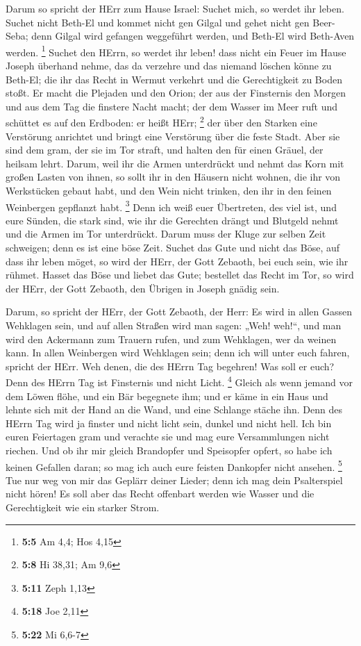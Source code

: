  Darum so spricht der HErr zum Hause Israel: Suchet mich, so
werdet ihr leben.  Suchet nicht Beth-El und kommet nicht gen
Gilgal und gehet nicht gen Beer-Seba; denn Gilgal wird gefangen
weggeführt werden, und Beth-El wird Beth-Aven werden. \footnote{\textbf{5:5}
  Am 4,4; Hos 4,15}  Suchet den HErrn, so werdet ihr leben!
dass nicht ein Feuer im Hause Joseph überhand nehme, das da verzehre und
das niemand löschen könne zu Beth-El;  die ihr das Recht in
Wermut verkehrt und die Gerechtigkeit zu Boden stoßt.  Er
macht die Plejaden und den Orion; der aus der Finsternis den Morgen und
aus dem Tag die finstere Nacht macht; der dem Wasser im Meer ruft und
schüttet es auf den Erdboden: er heißt HErr; \footnote{\textbf{5:8} Hi
  38,31; Am 9,6}  der über den Starken eine Verstörung
anrichtet und bringt eine Verstörung über die feste Stadt. 
Aber sie sind dem gram, der sie im Tor straft, und halten den für einen
Gräuel, der heilsam lehrt.  Darum, weil ihr die Armen
unterdrückt und nehmt das Korn mit großen Lasten von ihnen, so sollt ihr
in den Häusern nicht wohnen, die ihr von Werkstücken gebaut habt, und
den Wein nicht trinken, den ihr in den feinen Weinbergen gepflanzt habt.
\footnote{\textbf{5:11} Zeph 1,13}  Denn ich weiß euer
Übertreten, des viel ist, und eure Sünden, die stark sind, wie ihr die
Gerechten drängt und Blutgeld nehmt und die Armen im Tor unterdrückt.
 Darum muss der Kluge zur selben Zeit schweigen; denn es
ist eine böse Zeit.  Suchet das Gute und nicht das Böse,
auf dass ihr leben möget, so wird der HErr, der Gott Zebaoth, bei euch
sein, wie ihr rühmet.  Hasset das Böse und liebet das Gute;
bestellet das Recht im Tor, so wird der HErr, der Gott Zebaoth, den
Übrigen in Joseph gnädig sein.

 Darum, so spricht der HErr, der Gott Zebaoth, der Herr: Es
wird in allen Gassen Wehklagen sein, und auf allen Straßen wird man
sagen: „Weh! weh!{}``, und man wird den Ackermann zum Trauern rufen, und
zum Wehklagen, wer da weinen kann.  In allen Weinbergen
wird Wehklagen sein; denn ich will unter euch fahren, spricht der HErr.
 Weh denen, die des HErrn Tag begehren! Was soll er euch?
Denn des HErrn Tag ist Finsternis und nicht Licht. \footnote{\textbf{5:18}
  Joe 2,11}  Gleich als wenn jemand vor dem Löwen flöhe,
und ein Bär begegnete ihm; und er käme in ein Haus und lehnte sich mit
der Hand an die Wand, und eine Schlange stäche ihn.  Denn
des HErrn Tag wird ja finster und nicht licht sein, dunkel und nicht
hell.  Ich bin euren Feiertagen gram und verachte sie und
mag eure Versammlungen nicht riechen.  Und ob ihr mir
gleich Brandopfer und Speisopfer opfert, so habe ich keinen Gefallen
daran; so mag ich auch eure feisten Dankopfer nicht ansehen. \footnote{\textbf{5:22}
  Mi 6,6-7}  Tue nur weg von mir das Geplärr deiner Lieder;
denn ich mag dein Psalterspiel nicht hören!  Es soll aber
das Recht offenbart werden wie Wasser und die Gerechtigkeit wie ein
starker Strom.

